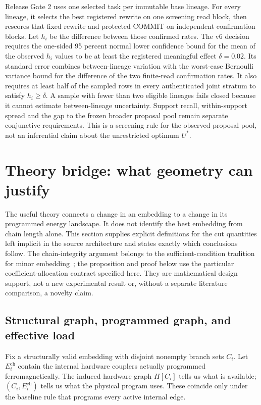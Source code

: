 \documentclass[11pt,a4paper]{article}
\theoremstyle{definition}\newtheorem{definition}[proposition]{Definition}
\begin{document}
Release Gate 2 uses one selected task per immutable base lineage. For every lineage, it selects the best registered rewrite on one screening read block, then rescores that fixed rewrite and protected COMMIT on independent confirmation blocks. Let $h_i$ be the difference between those confirmed rates. The v6 decision requires the one-sided 95 percent normal lower confidence bound for the mean of the observed $h_i$ values to be at least the registered meaningful effect $\delta=0.02$. Its standard error combines between-lineage variation with the worst-case Bernoulli variance bound for the difference of the two finite-read confirmation rates. It also requires at least half of the sampled rows in every authenticated joint stratum to satisfy $h_i\geq\delta$. A sample with fewer than two eligible lineages fails closed because it cannot estimate between-lineage uncertainty. Support recall, within-support spread and the gap to the frozen broader proposal pool remain separate conjunctive requirements. This is a screening rule for the observed proposal pool, not an inferential claim about the unrestricted optimum $U^*$.
 \section{Theory bridge: what geometry can justify}
\label{theory:bridge}

The useful theory connects a change in an embedding to a change in its programmed energy landscape. It does not identify the best embedding from chain length alone. This section supplies explicit definitions for the cut quantities left implicit in the source architecture and states exactly which conclusions follow. The chain-integrity argument belongs to the sufficient-condition tradition for minor embedding~\cite{choi2008}; the proposition and proof below use the particular coefficient-allocation contract specified here. They are mathematical design support, not a new experimental result or, without a separate literature comparison, a novelty claim.

\subsection{Structural graph, programmed graph, and effective load}
\label{theory:objects}

Fix a structurally valid embedding with disjoint nonempty branch sets $C_i$. Let $E_i^{\mathrm{ch}}$ contain the internal hardware couplers actually programmed ferromagnetically. The induced hardware graph $H[C_i]$ tells us what is available; $(C_i,E_i^{\mathrm{ch}})$ tells us what the physical program uses. These coincide only under the baseline rule that programs every active internal edge.
\end{document}
